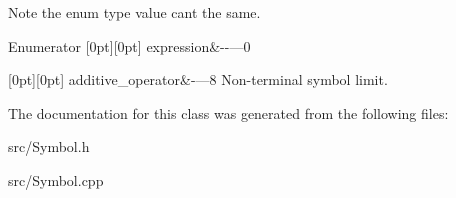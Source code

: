 \begin{DoxyNote}{Note}
the enum type value can\textquotesingle{}t the same. 
\end{DoxyNote}
\begin{DoxyEnumFields}{Enumerator}
[0pt][0pt]{}\hypertarget{class_symbol_a7ee37d4cfcb980f4eddf7ed1a028da5aa8661510d8a27e67fc96161d1c67289bd}{}\label{class_symbol_a7ee37d4cfcb980f4eddf7ed1a028da5aa8661510d8a27e67fc96161d1c67289bd} 
expression&-\/-\/---0 \\
\hline

[0pt][0pt]{}\hypertarget{class_symbol_a7ee37d4cfcb980f4eddf7ed1a028da5aa3db3ca894c8b0c7c2a94e4bef890032b}{}\label{class_symbol_a7ee37d4cfcb980f4eddf7ed1a028da5aa3db3ca894c8b0c7c2a94e4bef890032b} 
additive\+\_\+operator&-\/---8 Non-\/terminal symbol limit. \\
\hline

\end{DoxyEnumFields}


The documentation for this class was generated from the following files\+:\begin{DoxyCompactItemize}
\item 
src/Symbol.\+h\item 
src/Symbol.\+cpp\end{DoxyCompactItemize}
